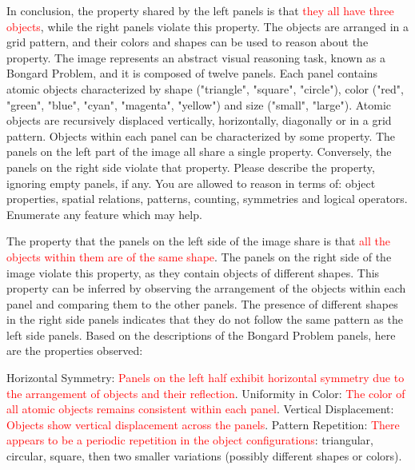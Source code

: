 \begin{tcolorbox}[breakable,enhanced jigsaw,opacityback=0,]
\begin{dialogue}
		In conclusion, the property shared by the left panels is that \textcolor{red}{they all have three objects}, while the right panels violate this property. The objects are arranged in a grid pattern, and their colors and shapes can be used to reason about the property.
		\vspace{1em}
		 The image represents an abstract visual reasoning task, known as a Bongard Problem, and it is composed of twelve panels. Each panel contains atomic objects characterized by shape ("triangle", "square", "circle"), color ("red", "green", "blue", "cyan", "magenta", "yellow") and size ("small", "large"). Atomic objects are recursively displaced vertically, horizontally, diagonally or in a grid pattern. Objects within each panel can be characterized by some property. The panels on the left part of the image all share a single property. Conversely, the panels on the right side violate that property. Please describe the property, ignoring empty panels, if any. You are allowed to reason in terms of: object properties, spatial relations, patterns, counting, symmetries and logical operators. Enumerate any feature which may help.
		
		The property that the panels on the left side of the image share is that \textcolor{red}{all the objects within them are of the same shape}. The panels on the right side of the image violate this property, as they contain objects of different shapes. This property can be inferred by observing the arrangement of the objects within each panel and comparing them to the other panels. The presence of different shapes in the right side panels indicates that they do not follow the same pattern as the left side panels.
		\vspace{1em}
		 Based on the descriptions of the Bongard Problem panels, here are the properties observed:
		
		Horizontal Symmetry: \textcolor{red}{Panels on the left half exhibit horizontal symmetry due to the arrangement of objects and their reflection}.
		Uniformity in Color: \textcolor{red}{The color of all atomic objects remains consistent within each panel}.
		Vertical Displacement: \textcolor{red}{Objects show vertical displacement across the panels}.
		Pattern Repetition: \textcolor{red}{There appears to be a periodic repetition in the object configurations}: triangular, circular, square, then two smaller variations (possibly different shapes or colors).
		

\end{dialogue}
\end{tcolorbox}
